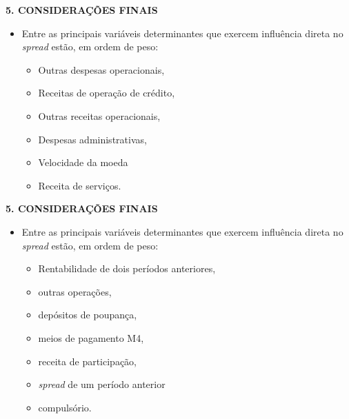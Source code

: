 \documentclass[
  ignorenonframetext,
  aspectratio=169,
  ignorenonframetext]{beamer}
\providecommand{\tightlist}{%
  \setlength{\itemsep}{0pt}\setlength{\parskip}{0pt}}
\begin{document}
\begin{frame}{\textbf{5. CONSIDERAÇÕES FINAIS}}
\protect\hypertarget{considerauxe7uxf5es-finais-1}{}
\begin{itemize}
\tightlist
\item
  Entre as principais variáveis determinantes que exercem influência
  direta no \emph{spread} estão, em ordem de peso:

  \begin{itemize}
  \tightlist
  \item
    Outras despesas operacionais,
  \item
    Receitas de operação de crédito,
  \item
    Outras receitas operacionais,
  \item
    Despesas administrativas,
  \item
    Velocidade da moeda
  \item
    Receita de serviços.
  \end{itemize}
\end{itemize}
\end{frame}

\begin{frame}{\textbf{5. CONSIDERAÇÕES FINAIS}}
\protect\hypertarget{considerauxe7uxf5es-finais-2}{}
\begin{itemize}
\tightlist
\item
  Entre as principais variáveis determinantes que exercem influência
  direta no \emph{spread} estão, em ordem de peso:

  \begin{itemize}
  \tightlist
  \item
    Rentabilidade de dois períodos anteriores,
  \item
    outras operações,
  \item
    depósitos de poupança,
  \item
    meios de pagamento M4,
  \item
    receita de participação,
  \item
    \emph{spread} de um período anterior
  \item
    compulsório.
  \end{itemize}
\end{itemize}
\end{frame}
\end{document}
